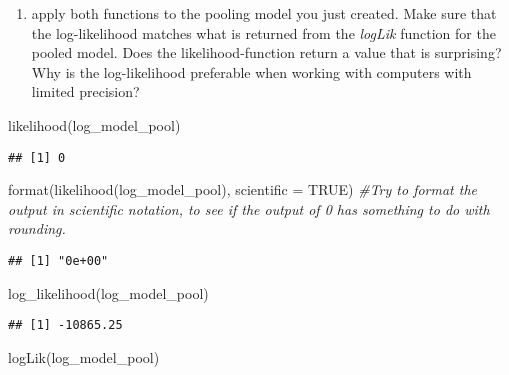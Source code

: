 \documentclass[
]{article}
\newenvironment{Shaded}{\begin{snugshade}}{\end{snugshade}}
\newcommand{\AttributeTok}[1]{\textcolor[rgb]{0.77,0.63,0.00}{#1}}
\newcommand{\CommentTok}[1]{\textcolor[rgb]{0.56,0.35,0.01}{\textit{#1}}}
\newcommand{\ConstantTok}[1]{\textcolor[rgb]{0.00,0.00,0.00}{#1}}
\newcommand{\FunctionTok}[1]{\textcolor[rgb]{0.00,0.00,0.00}{#1}}
\newcommand{\NormalTok}[1]{#1}
\providecommand{\tightlist}{%
  \setlength{\itemsep}{0pt}\setlength{\parskip}{0pt}}
\begin{document}
\begin{enumerate}
\def\labelenumi{\roman{enumi}.}
\setcounter{enumi}{2}
\tightlist
\item
  apply both functions to the pooling model you just created. Make sure
  that the log-likelihood matches what is returned from the
  \emph{logLik} function for the pooled model. Does the
  likelihood-function return a value that is surprising? Why is the
  log-likelihood preferable when working with computers with limited
  precision?
\end{enumerate}

\begin{Shaded}
\begin{Highlighting}[]
\FunctionTok{likelihood}\NormalTok{(log\_model\_pool)}
\end{Highlighting}
\end{Shaded}

\begin{verbatim}
## [1] 0
\end{verbatim}

\begin{Shaded}
\begin{Highlighting}[]
\FunctionTok{format}\NormalTok{(}\FunctionTok{likelihood}\NormalTok{(log\_model\_pool), }\AttributeTok{scientific =} \ConstantTok{TRUE}\NormalTok{) }\CommentTok{\#Try to format the output in scientific notation, to see if the output of 0 has something to do with rounding.}
\end{Highlighting}
\end{Shaded}

\begin{verbatim}
## [1] "0e+00"
\end{verbatim}

\begin{Shaded}
\begin{Highlighting}[]
\FunctionTok{log\_likelihood}\NormalTok{(log\_model\_pool)}
\end{Highlighting}
\end{Shaded}

\begin{verbatim}
## [1] -10865.25
\end{verbatim}

\begin{Shaded}
\begin{Highlighting}[]
\FunctionTok{logLik}\NormalTok{(log\_model\_pool)}
\end{Highlighting}
\end{Shaded}
\end{document}
